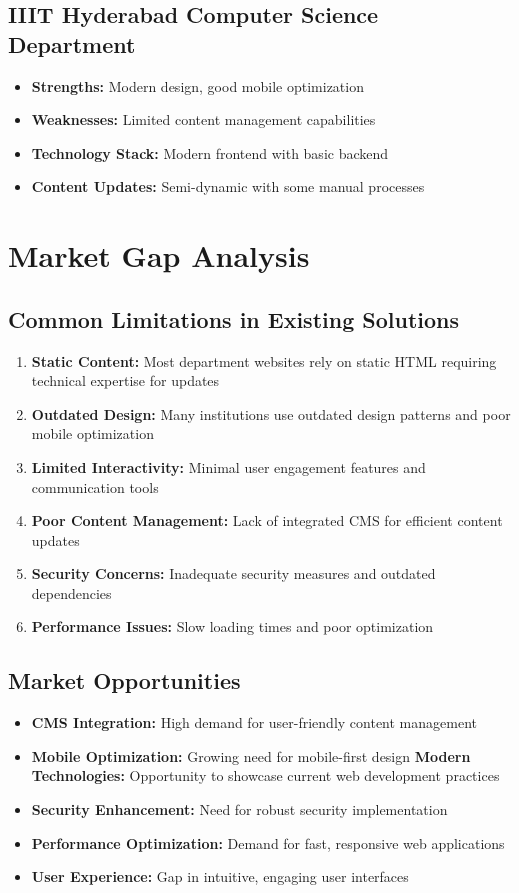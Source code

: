 \documentclass[12pt,a4paper]{report}
\begin{document}
\subsection{IIIT Hyderabad Computer Science Department}
\begin{itemize}
    \item \textbf{Strengths:} Modern design, good mobile optimization
    \item \textbf{Weaknesses:} Limited content management capabilities
    \item \textbf{Technology Stack:} Modern frontend with basic backend
    \item \textbf{Content Updates:} Semi-dynamic with some manual processes
\end{itemize}

\section{Market Gap Analysis}

\subsection{Common Limitations in Existing Solutions}
\begin{enumerate}
    \item \textbf{Static Content:} Most department websites rely on static HTML requiring technical expertise for updates
    \item \textbf{Outdated Design:} Many institutions use outdated design patterns and poor mobile optimization
    \item \textbf{Limited Interactivity:} Minimal user engagement features and communication tools
    \item \textbf{Poor Content Management:} Lack of integrated CMS for efficient content updates
    \item \textbf{Security Concerns:} Inadequate security measures and outdated dependencies
    \item \textbf{Performance Issues:} Slow loading times and poor optimization
\end{enumerate}

\subsection{Market Opportunities}
\begin{itemize}
    \item \textbf{CMS Integration:} High demand for user-friendly content management
    \item \textbf{Mobile Optimization:} Growing need for mobile-first design
    \textbf{Modern Technologies:} Opportunity to showcase current web development practices
    \item \textbf{Security Enhancement:} Need for robust security implementation
    \item \textbf{Performance Optimization:} Demand for fast, responsive web applications
    \item \textbf{User Experience:} Gap in intuitive, engaging user interfaces
\end{itemize}
\end{document}
